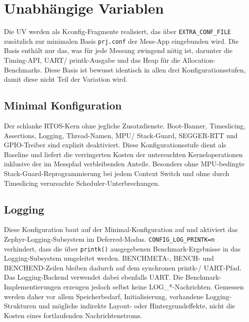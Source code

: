 \section{Unabh{\"a}ngige Variablen}
Die UV werden als Kconfig-Fragmente realisiert, das {\"u}ber \lstinline[style=fileinline]|EXTRA_CONF_FILE| zus{\"a}tzlich zur minimalen Basis \lstinline[style=fileinline]|prj.conf| der Mess-App eingebunden wird. Die Basis enth{\"a}lt nur das, was f{\"u}r jede Messung zwingend n{\"o}tig ist, darunter die Timing-API, UART/ printk-Ausgabe und das Heap f{\"u}r die Allocation-Benchmarks. Diese Basis ist bewusst identisch in allen drei Konfigurationsstufen, damit diese nicht Teil der Variation wird.

\subsection{Minimal Konfiguration}
Der schlanke RTOS-Kern ohne jegliche Zusatzdienste. Boot-Banner, Timeslicing, Assertions, Logging, Thread-Namen, MPU/ Stack-Guard, SEGGER-RTT und GPIO-Treiber sind explizit deaktiviert. Diese Konfigurationsstufe dient als Baseline und liefert die verringerten Kosten der untersuchten Kerneloperationen inklusive der im Messpfad verbleibenden Anteile. Besonders ohne MPU-bedingte Stack-Guard-Reprogrammierung bei jedem Context Switch und ohne durch Timeslicing verursachte Scheduler-Unterbrechungen.

\subsection{Logging}
Diese Konfiguration baut auf der Minimal-Konfiguration auf und aktiviert das Zephyr-Logging-Subsystem im Deferred-Modus. \lstinline[style=fileinline]|CONFIG_LOG_PRINTK=n| verhindert, dass die {\"u}ber \lstinline[style=fileinline]|printk()| ausgegebenen Benchmark-Ergebnisse in das Logging-Subsystem umgeleitet werden. BENCHMETA-, BENCH- und BENCHEND-Zeilen bleiben dadurch auf dem synchronen printk-/ UART-Pfad. Das Logging-Backend verwendet dabei ebenfalls UART. Die Benchmark-Implementierungen erzeugen jedoch selbst keine LOG\_*-Nachrichten. Gemessen werden daher vor allem Speicherbedarf, Initialisierung, vorhandene Logging-Strukturen und m{\"o}gliche indirekte Layout- oder Hintergrundeffekte, nicht die Kosten eines fortlaufenden Nachrichtenstroms.

